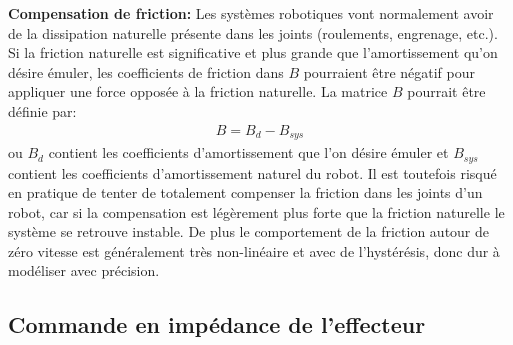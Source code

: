 \textbf{Compensation de friction: } Les systèmes robotiques vont normalement avoir de la dissipation naturelle présente dans les joints (roulements, engrenage, etc.). Si la friction naturelle est significative et plus grande que l'amortissement qu'on désire émuler, les coefficients de friction dans $B$ pourraient être négatif pour appliquer une force opposée à la friction naturelle. La matrice $B$ pourrait être définie par:
\begin{align}
B = B_{d} - B_{sys}
\end{align}
ou $B_{d}$ contient les coefficients d'amortissement que l'on désire émuler et $B_{sys}$ contient les coefficients d'amortissement naturel du robot. Il est toutefois risqué en pratique de tenter de totalement compenser la friction dans les joints d'un robot, car si la compensation est légèrement plus forte que la friction naturelle le système se retrouve instable. De plus le comportement de la friction autour de zéro vitesse est généralement très non-linéaire et avec de l'hystérésis, donc dur à modéliser avec précision. 


\subsection{Commande en impédance de l'effecteur}
\label{sec:effimpcontrol}

